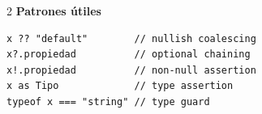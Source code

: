 \documentclass[11pt,a4paper]{article}
\begin{document}
\begin{multicols}{2}
\textbf{\textcolor{warnambel}{Patrones útiles}}
\begin{lstlisting}[style=typescript,numbers=none]
x ?? "default"        // nullish coalescing
x?.propiedad          // optional chaining
x!.propiedad          // non-null assertion
x as Tipo             // type assertion
typeof x === "string" // type guard
\end{lstlisting}
\end{multicols}
\end{document}
